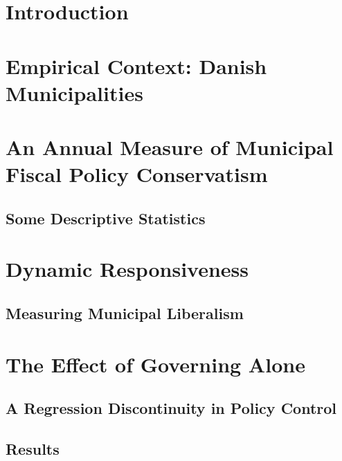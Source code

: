 \documentclass[a4paper,11pt]{article}
\begin{document}
	
\section{Introduction} %

\section{Empirical Context: Danish Municipalities}	

\section{An Annual Measure of Municipal Fiscal Policy Conservatism}

\subsection{Some Descriptive Statistics}

\section{Dynamic Responsiveness}

\subsection{Measuring Municipal Liberalism}

\section{The Effect of Governing Alone}

\subsection{A Regression Discontinuity in Policy Control}

\subsection{Results}
	
	
\end{document}

